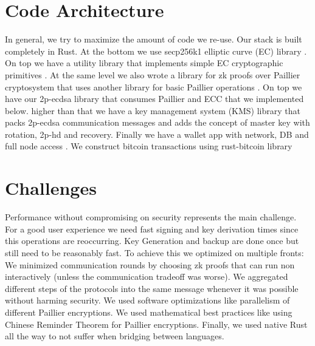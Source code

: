 \documentclass[runningheads]{llncs}
\begin{document}
\section{Code Architecture}
In general, we try to maximize the amount of code we re-use. Our stack is built completely in Rust. At the bottom we use secp256k1 elliptic curve (EC) library \cite{secp}. On top we have a utility library that implements simple EC cryptographic primitives \cite{curv}. At the same level we also wrote a library for zk proofs over Paillier cryptosystem \cite{zk-paillier} that uses another library for basic Paillier operations \cite{paillier}. On top we have our 2p-ecdsa library \cite{ecdsa} that consumes Paillier and ECC that we implemented below. higher than that we have a key management system (KMS) library \cite{kms} that packs 2p-ecdsa communication messages and adds the concept of master key with rotation, 2p-hd and recovery. Finally we have a wallet app with network, DB and full node access \cite{gotham}. We construct bitcoin transactions using rust-bitcoin library \cite{rust-bitcoin}

\section{Challenges}
Performance without compromising on security represents the main challenge. For a good user experience we need fast signing and key derivation times since this operations are reoccurring. Key Generation and backup are done once but still need to be reasonably fast. To achieve this we optimized on multiple fronts:  We minimized communication rounds by choosing zk proofs that can run non interactively (unless the communication tradeoff was worse). We aggregated different steps of the protocols into the same message whenever it was possible without harming security. We used software optimizations like parallelism of different Paillier encryptions. We used mathematical best practices like using Chinese Reminder Theorem for Paillier encryptions. Finally, we used native Rust all the way to not suffer when bridging between languages. 
\end{document}
